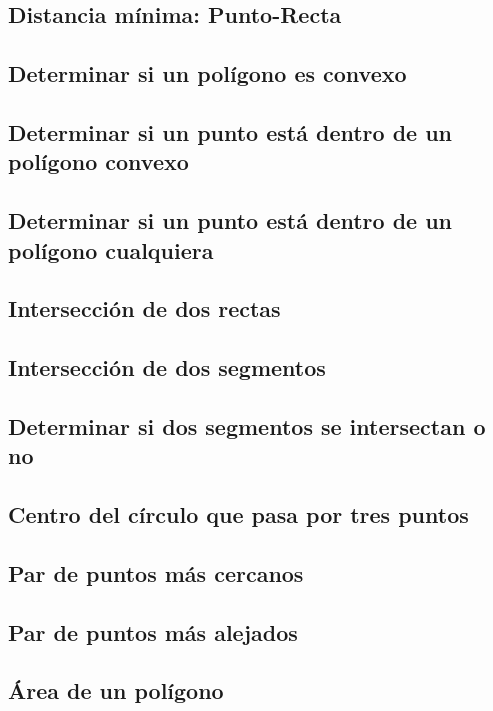 \documentclass[10pt,letterpaper,twocolumn,twosided]{article}
\begin{document}
\subsection{Distancia mínima: Punto-Recta}

\subsection{Determinar si un polígono es convexo}

\subsection{Determinar si un punto está dentro de un polígono convexo}

\subsection{Determinar si un punto está dentro de un polígono cualquiera}

\subsection{Intersección de dos rectas}

\subsection{Intersección de dos segmentos}

\subsection{Determinar si dos segmentos se intersectan o no}

\subsection{Centro del círculo que pasa por tres puntos}

\subsection{Par de puntos más cercanos}

\subsection{Par de puntos más alejados}

\subsection{Área de un polígono}
\end{document}
